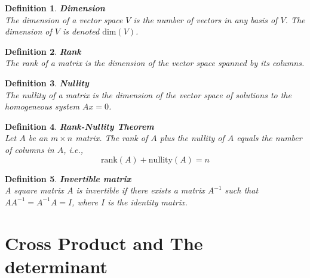 \documentclass[11pt]{book} %
\newtheorem{definition}{Definition}[section]
\begin{document}
\begin{definition}{\textbf{Dimension}} \\
    The dimension of a vector space \( V \) is the number of vectors in any basis of \( V \). The dimension of \( V \) is denoted \( \text{dim}(V) \).
\end{definition}

\begin{definition}{\textbf{Rank}} \\
    The rank of a matrix is the dimension of the vector space spanned by its columns.
\end{definition}

\begin{definition}{\textbf{Nullity}} \\
    The nullity of a matrix is the dimension of the vector space of solutions to the homogeneous system \( Ax = 0 \).
\end{definition}

\begin{definition}{\textbf{Rank-Nullity Theorem}} \\
    Let \( A \) be an \( m \times n \) matrix. The rank of \( A \) plus the nullity of \( A \) equals the number of columns in \( A \), i.e., 
    \[
    \text{rank}(A) + \text{nullity}(A) = n
    \]
\end{definition}

\begin{definition}{\textbf{Invertible matrix}} \\
    A square matrix \( A \) is invertible if there exists a matrix \( A^{-1} \) such that \( A A^{-1} = A^{-1} A = I \), where \( I \) is the identity matrix.
\end{definition}

\section{Cross Product and The determinant}
\end{document}
